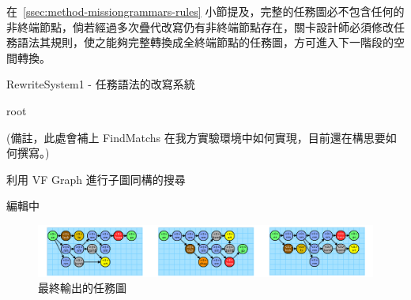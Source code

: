 在~\ref{ssec:method-missiongrammars-rules} 小節提及，完整的任務圖必不包含任何的非終端節點，倘若經過多次疊代改寫仍有非終端節點存在，關卡設計師必須修改任務語法其規則，使之能夠完整轉換成全終端節點的任務圖，方可進入下一階段的空間轉換。

\begin{algorithm}
    \caption{RewriteSystem1 - 任務語法的改寫系統}
    \label{alg:algorithm-missiongrammars-rewritesystem}
    \begin{algorithmic}
        \ENDIF
        \ENDFOR
        \RETURN root
    \end{algorithmic}
\end{algorithm}

(備註，此處會補上 FindMatchs 在我方實驗環境中如何實現，目前還在構思要如何撰寫。)

\begin{algorithm}
    \caption{利用 VF Graph 進行子圖同構的搜尋}
    \label{alg:algorithm-missiongrammars-rewritesystem-findmatchs}
    \begin{algorithmic}
        \RETURN 編輯中
    \end{algorithmic}
\end{algorithm}

\begin{figure}[ht]
  \begin{center}
    \includegraphics[width=1.0\textwidth]{figures/final-mission-graph.png}
    \caption{最終輸出的任務圖} 
    \label{fig:final-mission-graph}
  \end{center}
\end{figure}

